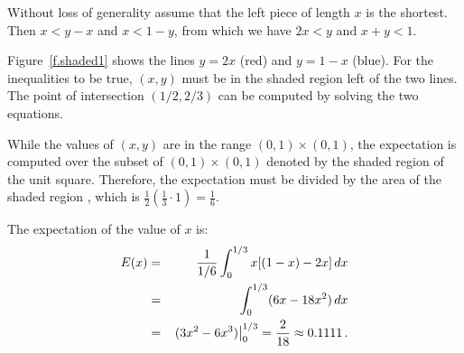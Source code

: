 \solution{}

 Without loss of generality assume that the left piece of length $x$ is the shortest. Then $x<y-x$ and $x < 1-y$, from which we have $2x<y$ and $x+y<1$.

Figure~\ref{f.shaded1} shows the lines $y=2x$ (red) and $y=1-x$ (blue).  For the inequalities to be true, $(x,y)$ must be in the shaded region left of the two lines. The point of intersection $(1/2,2/3)$ can be computed by solving the two equations.

While the values of $(x,y)$ are in the range $(0,1)\times(0,1)$, the expectation is computed over the subset of $(0,1)\times(0,1)$ denoted by the shaded region of the unit square. Therefore, the expectation must be divided by the area of the shaded region  , which is $\frac{1}{2} (\frac{1}{3}\cdot 1)=\frac{1}{6}$.

The expectation of the value of $x$ is:
\begin{eqnarray*}
E(x)&=& \frac{1}{1/6}\int_{0}^{1/3} x [(1-x)-2x]\,dx\\
&=&\int_{0}^{1/3} (6x -18x^2)\,dx\\
&=&\left. (3x^2-6x^3)\right|_0^{1/3}=\displaystyle\frac{2}{18}\approx 0.1111\,.
\end{eqnarray*}

